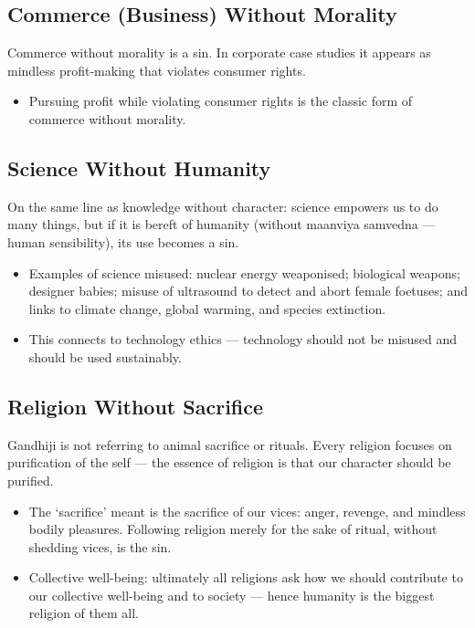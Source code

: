 \subsection{Commerce (Business) Without Morality}

Commerce without morality is a sin. In corporate case studies it appears as mindless profit-making that violates consumer rights.

\begin{itemize}
\item Pursuing profit while violating consumer rights is the classic form of commerce without morality.
\end{itemize}

\subsection{Science Without Humanity}

On the same line as knowledge without character: science empowers us to do many things, but if it is bereft of humanity (without maanviya samvedna --- human sensibility), its use becomes a sin.

\begin{itemize}
\item Examples of science misused: nuclear energy weaponised; biological weapons; designer babies; misuse of ultrasound to detect and abort female foetuses; and links to climate change, global warming, and species extinction.
\item This connects to technology ethics --- technology should not be misused and should be used sustainably.
\end{itemize}

\subsection{Religion Without Sacrifice}

Gandhiji is not referring to animal sacrifice or rituals. Every religion focuses on purification of the self --- the essence of religion is that our character should be purified.

\begin{itemize}
\item The `sacrifice' meant is the sacrifice of our vices: anger, revenge, and mindless bodily pleasures. Following religion merely for the sake of ritual, without shedding vices, is the sin.
\item Collective well-being: ultimately all religions ask how we should contribute to our collective well-being and to society --- hence humanity is the biggest religion of them all.
\end{itemize}

